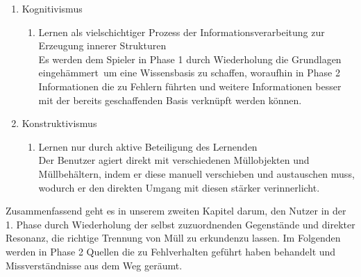\documentclass[a4paper]{article}
\begin{document}
\begin{enumerate}
\begin{enumerate}
\item Kognitivismus
  \begin{enumerate}
    \item Lernen als vielschichtiger Prozess der Informationsverarbeitung zur Erzeugung innerer Strukturen\\
   Es werden dem Spieler in Phase 1 durch Wiederholung die Grundlagen \glqq eingehämmert\grqq\ um eine Wissensbasis zu schaffen, woraufhin in Phase 2 Informationen die zu Fehlern führten und weitere Informationen besser mit der bereits geschaffenden Basis verknüpft werden können.
  \end{enumerate}
  
\item Konstruktivismus
  \begin{enumerate}
    \item Lernen nur durch aktive Beteiligung des Lernenden\\
    Der Benutzer agiert direkt mit verschiedenen Müllobjekten und Müllbehältern, indem er diese manuell verschieben und austauschen muss, wodurch er den direkten Umgang mit diesen stärker verinnerlicht.
  \end{enumerate}

\end{enumerate}
            
Zusammenfassend  geht es in unserem zweiten Kapitel darum, den Nutzer in der 1. Phase durch Wiederholung der selbst zuzuordnenden Gegenstände und direkter Resonanz, die richtige Trennung von Müll zu \glqq erkunden\grqq zu lassen. Im Folgenden werden in Phase 2 Quellen die zu Fehlverhalten geführt haben behandelt und Missverständnisse aus dem Weg geräumt.


\end{enumerate}


\makeatletter
\def\footrule{{
  \vskip-\footruleskip\vskip-\footrulewidth
  \color{\footrulecolor}
  \hrule\@width\headwidth\@height
  \footrulewidth\vskip\footruleskip
}}
\makeatother
\renewcommand{\footrulewidth}{3pt}
\newcommand{\footrulecolor}{dgreen}
\end{document}
